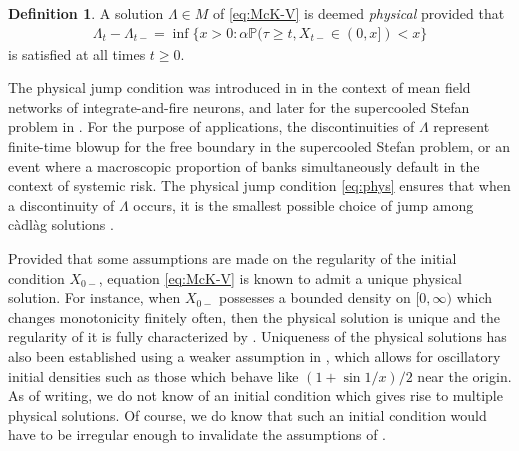 \documentclass[12pt]{amsart}
\newcommand{\bP}{\mathbb{P}}
\theoremstyle{plain}
\theoremstyle{definition}
\newtheorem{defn}[thm]{Definition}
\begin{document}
\begin{defn}
A solution $\Lambda\in M$ of \eqref{eq:McK-V} is deemed \emph{physical} provided that
\begin{align}\label{eq:phys}
\Lambda_{t}-\Lambda_{t-}=\inf\{x>0:\alpha\bP(\tau\ge t, X_{t-}\in(0,x])<x\}
\end{align}
is satisfied at all times $t\ge 0$.
\end{defn}

The physical jump condition was introduced in \cite{delarue_particle_2015} in the context of mean field networks of integrate-and-fire neurons, and later for the supercooled Stefan problem in \cite{delarue_global_2022}.
For the purpose of applications, the discontinuities of $\Lambda$ represent finite-time blowup for the free boundary in the supercooled Stefan problem, or an event where a macroscopic proportion of banks simultaneously default in the context of systemic risk. The physical jump condition \eqref{eq:phys} ensures that when a discontinuity of $\Lambda$ occurs, it is the smallest possible choice of jump among c\`adl\`ag solutions \cite[Proposition 1.2]{hambly_mckean--vlasov_2018}.

\medskip

Provided that some assumptions are made on the regularity of the initial condition $X_{0-}$, equation \eqref{eq:McK-V} is known to admit a unique physical solution. For instance, when $X_{0-}$ possesses a bounded density on $[0,\infty)$ which changes monotonicity finitely often, then the physical solution is unique and the regularity of it is fully characterized by \cite[Theorems 1.1 and 1.4]{delarue_global_2022}. Uniqueness of the physical solutions has also been established using a weaker assumption in \cite{mustapha_well-posedness_2023}, which allows for oscillatory initial densities such as those which behave like $(1+\sin 1/x)/2$ near the origin. As of writing, we do not know of an initial condition which gives rise to multiple physical solutions. Of course, we do know that such an initial condition would have to be irregular enough to invalidate the assumptions of \cite{delarue_global_2022,mustapha_well-posedness_2023}.

\medskip
\end{document}
